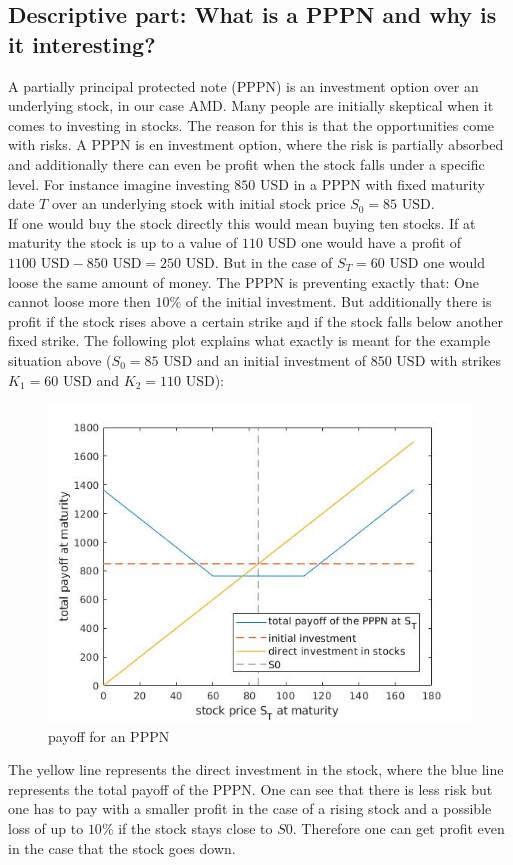 \documentclass[11pt,oneside,a4paper]{article}
\begin{document}
	\subsection{Descriptive part: What is a PPPN and why is it interesting?}
	A partially principal protected note (PPPN) is an investment option over an underlying stock, in our case AMD. Many people are initially skeptical when it comes to investing in stocks. The reason for this is that the opportunities come with risks. A PPPN is en investment option, where the risk is partially absorbed and additionally there can even be profit when the stock falls under a specific level. For instance imagine investing $850 \text{ USD}$ in a PPPN with fixed maturity date $ T $ over an underlying stock with initial stock price $ S_0 = 85 \text{ USD} $.\\
	 If one would buy the stock directly this would mean buying ten stocks. If at maturity the stock is up to a value of $ 110 \text{ USD} $ one would have a profit of $ 1100 \text{ USD} - 850 \text{ USD} = 250 \text{ USD}  $. But in the case of $ S_T = 60 \text{ USD} $ one would loose the same amount of money.
	 The PPPN is preventing exactly that: One cannot loose more then $ 10 \% $ of the initial investment. But additionally there is profit if the stock rises above a certain strike $\underline{\text{and}}$ if the stock falls below another fixed strike. The following plot explains what exactly is meant for the example situation above ($ S_0 = 85 \text{ USD}$ and an initial investment of $ 850 \text{ USD} $ with strikes $ K_1 = 60\text{ USD} $ and  $ K_2 = 110\text{ USD} $): 
	\begin{figure}[H]
		\centering
		\includegraphics[width=0.6\linewidth]{payoff_PPPN.jpg}
		 \caption{payoff for an PPPN}
	\end{figure} 
	The yellow line represents the direct investment in the stock, where the blue line represents the total payoff of the PPPN. One can see that there is less risk but one has to pay with a smaller profit in the case of a rising stock and a possible loss of up to $ 10 \% $ if the stock stays close to $ S0 $.  Therefore one can get profit even in the case that the stock goes down.
\end{document}
